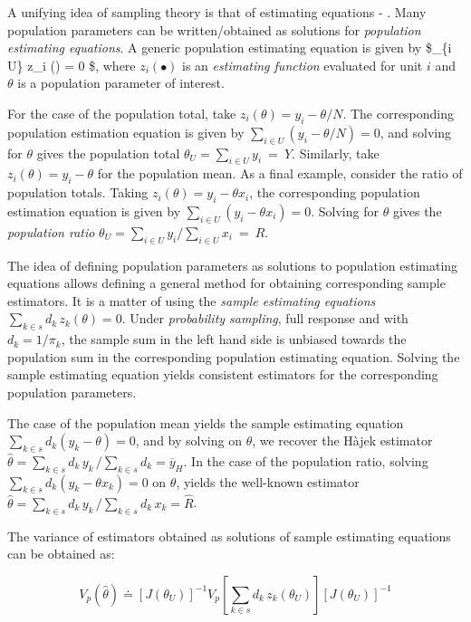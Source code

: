 \documentclass[
  12pt,
]{book}
\begin{document}
A unifying idea of sampling theory is that of estimating equations - \citet{Binder1983}. Many population parameters can be written/obtained as solutions for \emph{population estimating equations}. A generic population estimating equation is given by \$\sum \_\{i \in U\} z\_i (\theta) = 0 \$, where \(z_i(\bullet)\) is an \emph{estimating function} evaluated for unit \(i\) and \(\theta\) is a population parameter of interest.

For the case of the population total, take \(z_i(\theta) = y_i - \theta / N\). The corresponding population estimation equation is given by \(\sum _{i \in U} (y_i - \theta / N) = 0\), and solving for \(\theta\) gives the population total \(\theta_U = \sum _{i \in U} y_i \ = \ Y\). Similarly, take \(z_i(\theta) = y_i - \theta\) for the population mean. As a final example, consider the ratio of population totals. Taking \(z_i(\theta) = y_i - \theta x_i\), the corresponding population estimation equation is given by \(\sum _{i \in U} (y_i - \theta x_i) = 0\). Solving for \(\theta\) gives the \emph{population ratio} \(\theta_U = \sum _{i \in U} y_i / \sum _{i \in U} x_i \ = \ R\).

The idea of defining population parameters as solutions to population estimating equations allows defining a general method for obtaining corresponding sample estimators. It is a matter of using the \emph{sample estimating equations} \(\sum _{k \in s} d_k \, z_k (\theta) = 0\). Under \emph{probability sampling}, full response and with \(d_k = 1 / \pi_k\), the sample sum in the left hand side is unbiased towards the population sum in the corresponding population estimating equation. Solving the sample estimating equation yields consistent estimators for the corresponding population parameters.

The case of the population mean yields the sample estimating equation \(\sum _{k \in s} d_k (y_k - \theta) = 0\), and by solving on \(\theta\), we recover the Hàjek estimator \(\widehat \theta = \sum _{k \in s} d_k \, y_k \, / \sum _{k \in s} d_k = \overline y_H\). In the case of the population ratio, solving \(\sum _{k \in s} d_k (y_k - \theta x_k) = 0\) on \(\theta\), yields the well-known estimator \(\widehat \theta = \sum _{k \in s} d_k \, y_k \, / \sum _{k \in s} d_k \, x_k = \widehat R\).

The variance of estimators obtained as solutions of sample estimating equations can be obtained as:

\[
V_p (\widehat \theta) \doteq \left[ J (\theta_U) \right] ^{-1} V_p \left[ \sum _{k \in s} d_k \, z_k (\theta_U) \right] \left[ J (\theta_U) \right] ^{-1}
\]
\end{document}
